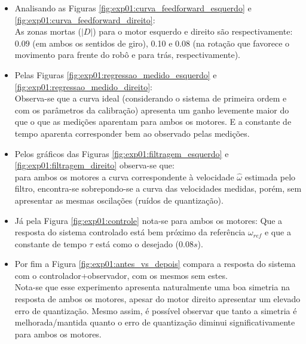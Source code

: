 \begin{itemize}
    \item Analisando as Figuras \ref{fig:exp01:curva_feedforward_esquerdo} e \ref{fig:exp01:curva_feedforward_direito}:\\
        As zonas mortas ($|D|$) para o motor esquerdo e direito são respectivamente: $0.09$ (em ambos os sentidos de giro), 0.10 e 0.08 (na rotação que favorece o movimento para frente do robô e para trás, respectivamente).
    \item Pelas Figuras \ref{fig:exp01:regressao_medido_esquerdo} e \ref{fig:exp01:regressao_medido_direito}:\\
        Observa-se que a curva ideal (considerando o sistema de primeira ordem e com os parâmetros da calibração) apresenta um ganho levemente maior do que o que as medições aparentam para ambos os motores. E a constante de tempo aparenta corresponder bem ao observado pelas medições.
    \item Pelos gráficos das Figuras \ref{fig:exp01:filtragem_esquerdo} e \ref{fig:exp01:filtragem_direito} observa-se que:\\
        para ambos os motores a curva correspondente à velocidade $\hat{\omega}$ estimada pelo filtro, encontra-se sobrepondo-se a curva das velocidades medidas, porém, sem apresentar as mesmas oscilações (ruídos de quantização).
    \item Já pela Figura \ref{fig:exp01:controle} nota-se para ambos os motores:
        Que a resposta do sistema controlado está bem próximo da referência $\omega_{ref}$ e que a constante de tempo $\tau$ está como o desejado ($0.08s$).
    \item Por fim a Figura \ref{fig:exp01:antes_vs_depois} compara a resposta do sistema com o controlador+observador, com os mesmos sem estes. \\
        Nota-se que esse experimento apresenta naturalmente uma boa simetria na resposta de ambos os motores, apesar do motor direito apresentar um elevado erro de quantização. Mesmo assim, é possível observar que tanto a simetria é melhorada/mantida quanto o erro de quantização diminui significativamente para ambos os motores.
\end{itemize}

